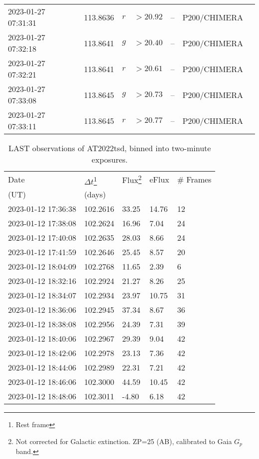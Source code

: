 \documentclass{nature_plusfigure}
\begin{document}
\begin{supplement}
\begin{center}
\begin{longtable}{lllllll}
2023-01-27 07:31:31 & 113.8636 & $r$ & $>20.92$ & -- & P200/CHIMERA &  \\ 
2023-01-27 07:32:18 & 113.8641 & $g$ & $>20.40$ & -- & P200/CHIMERA &  \\ 
2023-01-27 07:32:21 & 113.8641 & $r$ & $>20.61$ & -- & P200/CHIMERA &  \\ 
2023-01-27 07:33:08 & 113.8645 & $g$ & $>20.73$ & -- & P200/CHIMERA &  \\ 
2023-01-27 07:33:11 & 113.8645 & $r$ & $>20.77$ & -- & P200/CHIMERA &  \\ 
\hline 
\end{longtable} 
\end{center} 


\clearpage

\begin{center} 
\begin{longtable}{lllll} 
\caption{LAST observations of AT2022tsd, binned into two-minute exposures.} 
\label{tab:last-photometry}\\ 
\hline\hline
Date & $\Delta t$\footnote{Rest frame} & Flux\footnote{Not corrected for Galactic extinction. ZP=25 (AB), calibrated to Gaia $G_p$ band.} & eFlux & \# Frames\\ 
(UT) & (days) &  &  & \\ 
\hline
2023-01-12 17:36:38 & 102.2616 & 33.25 & 14.76 & 12 \\ 
2023-01-12 17:38:08 & 102.2624 & 16.96 & 7.04 & 24 \\ 
2023-01-12 17:40:08 & 102.2635 & 28.03 & 8.66 & 24 \\ 
2023-01-12 17:41:59 & 102.2646 & 25.45 & 8.57 & 20 \\ 
2023-01-12 18:04:09 & 102.2768 & 11.65 & 2.39 & 6 \\ 
2023-01-12 18:32:16 & 102.2924 & 21.27 & 8.26 & 25 \\ 
2023-01-12 18:34:07 & 102.2934 & 23.97 & 10.75 & 31 \\ 
2023-01-12 18:36:06 & 102.2945 & 37.34 & 8.67 & 36 \\ 
2023-01-12 18:38:08 & 102.2956 & 24.39 & 7.31 & 39 \\ 
2023-01-12 18:40:06 & 102.2967 & 29.39 & 9.04 & 42 \\ 
2023-01-12 18:42:06 & 102.2978 & 23.13 & 7.36 & 42 \\ 
2023-01-12 18:44:06 & 102.2989 & 22.31 & 7.21 & 42 \\ 
2023-01-12 18:46:06 & 102.3000 & 44.59 & 10.45 & 42 \\ 
2023-01-12 18:48:06 & 102.3011 & -4.80 & 6.18 & 42 \\ 

\end{longtable}
\end{center}
\end{supplement}
\end{document}
